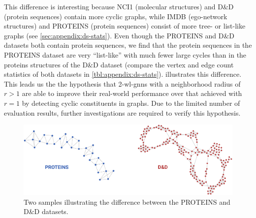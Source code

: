 This difference is interesting because NCI1 (molecular structures) and D\&D (protein sequences) contain more cyclic graphs, while IMDB (ego-network structures) and PROTEINS (protein sequences) consist of more tree- or list-like graphs (see \cref{sec:appendix:ds-stats}).
Even though the PROTEINS and D\&D datasets both contain protein sequences, we find that the protein sequences in the PROTEINS dataset are very ``list-like'' with much fewer large cycles than in the proteins structures of the D\&D dataset (compare the vertex and edge count statistics of both datasets in \cref{tbl:appendix:ds-stats}).
 illustrates this difference.
This leads us the the hypothesis that 2-\acs{wl}-\acsp{gnn} with a neighborhood radius of $r > 1$ are able to improve their real-world performance over that achieved with $r = 1$ by detecting cyclic constituents in graphs.
Due to the limited number of evaluation results, further investigations are required to verify this hypothesis.
\begin{figure}[h]
	\centering
	\includegraphics[width=0.8\linewidth]{gfx/evaluation/proteins-dd-diff.pdf}
	\caption{
		Two samples illustrating the difference between the PROTEINS and D\&D datasets.
	}\label{fig:evaluation:proteins-dd-diff}
\end{figure}
